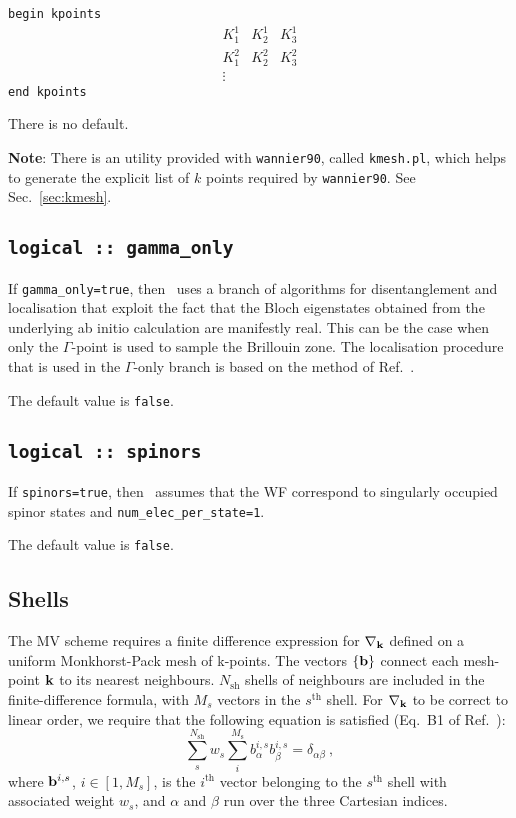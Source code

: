 \noindent \verb#begin kpoints# \\
$$
\begin{array}{ccc}
 K^{1}_{1} & K^{1}_{2} & K^{1}_{3} \\
 K^{2}_{1} & K^{2}_{2} & K^{2}_{3} \\
\vdots
\end{array}
$$
\verb#end kpoints#


There is no default.

{\bfseries Note}: There is an utility provided with {\tt wannier90},
called {\tt kmesh.pl}, which helps to generate the explicit list of
$k$ points required by {\tt wannier90}. See Sec.~\ref{sec:kmesh}.

\subsection[gamma\_only]{{\tt logical :: gamma\_only}}

If {\tt gamma\_only=true}, then \wannier\ uses a branch of algorithms
for disentanglement and localisation that exploit the fact that the
Bloch eigenstates obtained from the underlying ab initio calculation
are manifestly real. This can be the case when only the $\Gamma$-point
is used to sample the Brillouin zone. The localisation procedure
that is used in the $\Gamma$-only branch is based on the method of
Ref.~\cite{gygi-cpc03}.

The default value is {\tt false}.


\subsection[spinors]{{\tt logical :: spinors}}

If {\tt spinors=true}, then \wannier\
assumes that the WF correspond to singularly occupied spinor states and {\tt num\_elec\_per\_state=1}.

The default value is {\tt false}.

\subsection{Shells}

The MV scheme requires a finite difference expression
for $\nabla_{\bf k}$ defined on a uniform Monkhorst-Pack mesh of
k-points. The vectors $\{{\bf b}\}$ connect each mesh-point ${\bf k}$
  to its nearest neighbours. $N_{\mathrm{sh}}$ shells of neighbours
  are included in the finite-difference formula, with $M_s$ vectors in
  the $s^{\mathrm{th}}$ shell. For $\nabla_{{\bf k}}$ to be correct to
  linear order, we require that the following equation is satisfied
  (Eq.~B1 of Ref.~\cite{marzari-prb97}):
\begin{equation}\label{eq:B1}
\sum_{s}^{N_{\mathrm{sh}}} w_s \sum_i^{M_{\mathrm{s}}}
b_{\alpha}^{i,s} b_{\beta}^{i,s} = \delta_{\alpha\beta}\:,
\end{equation}
where ${\bf b}^{i,s}$, $i\in[1,M_s]$, is the
$i^{\mathrm{th}}$ vector belonging to the $s^{\mathrm{th}}$ shell
with associated weight $w_s$, and $\alpha$ and $\beta$ run over the
three Cartesian indices.


